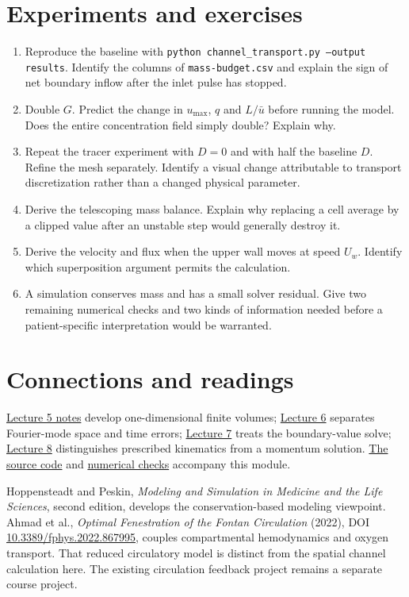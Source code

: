 \documentclass[11pt,letterpaper]{article}
\theoremstyle{definition}\newtheorem{definition}{Definition}\newtheorem{example}{Example}
\numberwithin{equation}{section}
\begin{document}
\section{Experiments and exercises}
\begin{enumerate}
\item Reproduce the baseline with \texttt{python channel\_transport.py --output results}. Identify the columns of \texttt{mass-budget.csv} and explain the sign of net boundary inflow after the inlet pulse has stopped.
\item Double $G$. Predict the change in $u_{\max}$, $q$ and $L/\bar u$ before running the model. Does the entire concentration field simply double? Explain why.
\item Repeat the tracer experiment with $D=0$ and with half the baseline $D$. Refine the mesh separately. Identify a visual change attributable to transport discretization rather than a changed physical parameter.
\item Derive the telescoping mass balance. Explain why replacing a cell average by a clipped value after an unstable step would generally destroy it.
\item Derive the velocity and flux when the upper wall moves at speed $U_w$. Identify which superposition argument permits the calculation.
\item A simulation conserves mass and has a small solver residual. Give two remaining numerical checks and two kinds of information needed before a patient-specific interpretation would be warranted.
\end{enumerate}

\section*{Connections and readings}
\href{../../m05/notes.pdf}{Lecture 5 notes} develop one-dimensional finite volumes; \href{../../m06/notes.pdf}{Lecture 6} separates Fourier-mode space and time errors; \href{../../m07/notes.pdf}{Lecture 7} treats the boundary-value solve; \href{../../m08/notes.pdf}{Lecture 8} distinguishes prescribed kinematics from a momentum solution. \href{channel_transport.py}{The source code} and \href{results/verification.json}{numerical checks} accompany this module.

Hoppensteadt and Peskin, \emph{Modeling and Simulation in Medicine and the Life Sciences}, second edition, develops the conservation-based modeling viewpoint. Ahmad et al., \emph{Optimal Fenestration of the Fontan Circulation} (2022), DOI \href{https://doi.org/10.3389/fphys.2022.867995}{10.3389/fphys.2022.867995}, couples compartmental hemodynamics and oxygen transport. That reduced circulatory model is distinct from the spatial channel calculation here. The existing circulation feedback project remains a separate course project.
\end{document}

